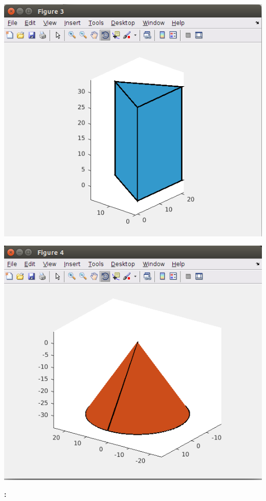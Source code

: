 \documentclass[11pt]{article}
\begin{document}
\begin{description}
      		\item \includegraphics[scale=.8]{lab8_fig3.png}\\
      		\item \includegraphics[scale=.8]{lab8_fig4.png}
	 
  \item [\textbf{ \large Assignment}] \textbf{ \Large :}\\


\end{description}
\end{document}
